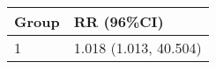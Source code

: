 \begin{tabular}{ll}
  \hline
Group & RR (96\%CI) \\ 
  \hline
   1 & 1.018 (1.013, 40.504) \\ 
   \hline
\end{tabular}

